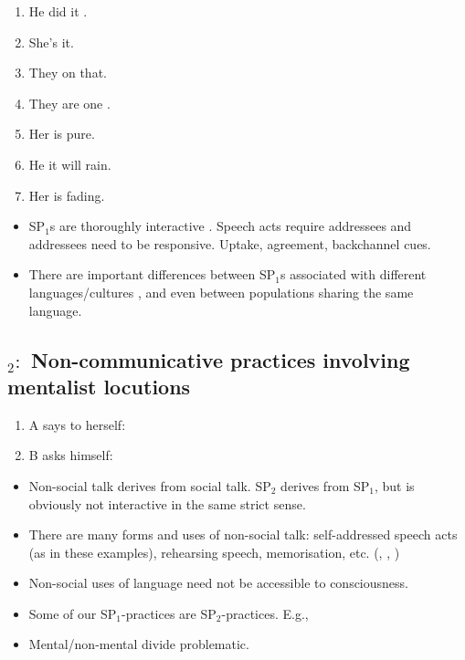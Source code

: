 \documentclass[12pt]{article}
\begin{document}
\parbox[c]{.33\linewidth}{\small\raggedright
\begin{enumerate}{\hspace*{.5ex}}\itemsep=.2ex
\item He did it .
\item She's  it.
\item They  on that.
\item They are one .
\item Her  is pure.
\item He  it will rain.
\item Her  is fading.
\end{enumerate}}

\begin{itemize}
\item SP$_1$s are thoroughly interactive \cite{Clark:1996}. Speech acts require addressees and addressees need to be responsive. Uptake, agreement, backchannel cues. 
\item There are important differences between SP$_1$s associated with different languages/cultures \cite{Lillard:1998}, and even between populations sharing the same language. 
\end{itemize}
\subsection*{$_2:$ Non-communicative practices involving mentalist locutions}
\begin{enumerate}{--}\itemsep=.2ex
\item A says to herself: 
\item B asks himself: 
\end{enumerate}

\begin{itemize}
\item Non-social talk derives from social talk. SP$_2$ derives from SP$_1$, but is obviously not interactive in the same strict sense.
\item There are many forms and uses of non-social talk: self-addressed speech acts (as in these examples), rehearsing speech, memorisation, etc. (, , )
\item Non-social uses of language need not be accessible to consciousness.
\item Some of our SP$_1$-practices are  SP$_2$-practices. E.g., 
\item Mental/non-mental divide problematic.
\end{itemize}
\end{document}
